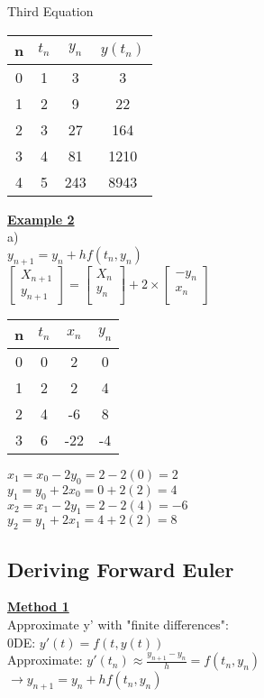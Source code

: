 \documentclass[12pt]{article}
\newcommand{\myt}[1]{\textbf{\underline{#1}}}
\begin{document}
	Third Equation\\
	\begin{tabular}{c | c c c }
		n & $t_n$ & $y_n$ & $y(t_n)$\\ \hline
		0 & 1 & 3 & 3\\
		1 & 2 & 9 & 22\\
		2 & 3 & 27 & 164\\
		3 & 4 & 81 & 1210\\
		4 & 5 & 243 & 8943\\
	\end{tabular}

	\myt{Example 2}\\
	a)\\
	$y_{n+1} = y_n + hf(t_n,y_n)$\\
	$
	\begin{bmatrix}
		X_{n+1} \\
		y_{n+1}
	\end{bmatrix}
	=
	\begin{bmatrix}
	 X_n \\
	 y_n \\
	\end{bmatrix}
	+ 2 \times
	\begin{bmatrix}
		-y_n \\
		x_n \\
	\end{bmatrix}
	$\\
	
	\begin{tabular}{c | c c c }
		n & $t_n$ & $x_n$ & $y_n$\\ \hline
		0 & 0 & 2 & 0\\
		1 & 2 & 2 & 4\\
		2 & 4 & -6 & 8\\
		3 & 6 & -22 & -4\\
	\end{tabular}

	$x_1 = x_0 - 2y_0 = 2-2(0) = 2$\\
	$y_1 = y_0 + 2x_0 = 0 + 2(2) = 4$\\
	$x_2 = x_1 - 2y_1 = 2 - 2(4) = -6$\\
	$y_2 = y_1 + 2x_1 = 4 + 2(2) = 8$\\
	
	\subsection*{Deriving Forward Euler}
	
	\myt{Method 1}\\
	Approximate y' with "finite differences":\\
	0DE: $y'(t) = f(t,y(t))$\\
	Approximate: $y'(t_n) \approx \frac{y_{n+1} - y_n}{h} = f(t_n,y_n)$\\
	$\rightarrow y_{n+1} = y_n + hf(t_n, y_n)$\\
	
\end{document}
